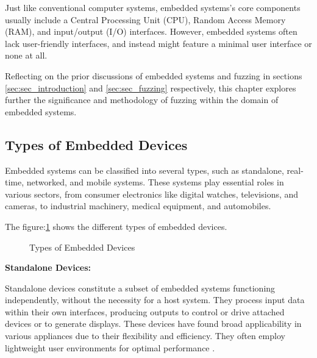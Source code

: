 Just like conventional computer systems, embedded systems's core components
usually include a Central Processing Unit (CPU)\cite{WhatisaC78:online},
Random Access Memory (RAM), and input/output (I/O) interfaces. However,
embedded systems often lack user-friendly interfaces, and instead might
feature a minimal user interface or none at all\cite{MainType35:online}.

Reflecting on the prior discussions of embedded systems and fuzzing in
sections \ref{sec:sec_introduction} and \ref{sec:sec_fuzzing} respectively,
this chapter explores further the significance and methodology of fuzzing
within the domain of embedded systems.

\subsection{Types of Embedded Devices}
Embedded systems can be classified into several types, such as standalone,
real-time, networked, and mobile systems\cite{Classifi68:online}. These
systems play essential roles in various sectors, from consumer
electronics\cite{andrae2010life} like digital watches\cite{Whatisas39:online},
televisions, and cameras, to industrial machinery\cite{thramboulidis2007soa},
medical equipment\cite{jafari2007medical}, and
automobiles\cite{Automoti68:online}\cite{li2003real}\cite{MainType35:online}.

The figure:\ref{fig:types_of_embedded_devices} shows the different types of embedded devices.

\begin{figure}[h]
        \centering
        \caption{Types of Embedded Devices}\label{fig:types_of_embedded_devices}
\end{figure}

\textbf{Standalone Devices:}

Standalone devices constitute a subset of embedded systems functioning
independently, without the necessity for a host system. They process input
data within their own interfaces, producing outputs to control or drive
attached devices or to generate displays. These devices have found broad
applicability in various appliances due to their flexibility and efficiency.
They often employ lightweight user environments for optimal
performance \cite{yun2022fuzzing}\cite{WhatAreE30:online}\cite{TypesofE31:online}.

